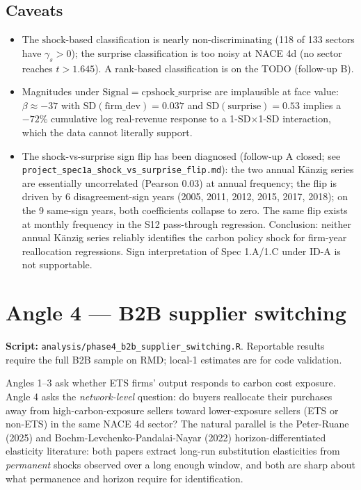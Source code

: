 \documentclass[11pt]{article}
\begin{document}
\subsection{Caveats}
\begin{itemize}
  \item The $\mathrm{shock}$-based classification is nearly non-discriminating (118 of 133 sectors have $\gamma_s > 0$); the $\mathrm{surprise}$ classification is too noisy at NACE 4d (no sector reaches $t > 1.645$). A rank-based classification is on the TODO (follow-up B).
  \item Magnitudes under $\mathrm{Signal}=\mathrm{cpshock\_surprise}$ are implausible at face value: $\beta \approx -37$ with $\mathrm{SD}(\mathrm{firm\_dev}) = 0.037$ and $\mathrm{SD}(\mathrm{surprise}) = 0.53$ implies a $-72\%$ cumulative log real-revenue response to a 1-SD$\times$1-SD interaction, which the data cannot literally support.
  \item The shock-vs-surprise sign flip has been diagnosed (follow-up A closed; see \texttt{project\_spec1a\_shock\_vs\_surprise\_flip.md}): the two annual K\"anzig series are essentially uncorrelated (Pearson 0.03) at annual frequency; the flip is driven by 6 disagreement-sign years (2005, 2011, 2012, 2015, 2017, 2018); on the 9 same-sign years, both coefficients collapse to zero. The same flip exists at monthly frequency in the S12 pass-through regression. Conclusion: neither annual K\"anzig series reliably identifies the carbon policy shock for firm-year reallocation regressions. Sign interpretation of Spec 1.A/1.C under ID-A is not supportable.
\end{itemize}

\section{Angle 4 --- B2B supplier switching}
\label{sec:b2b}

\textbf{Script:} \texttt{analysis/phase4\_b2b\_supplier\_switching.R}. Reportable results require the full B2B sample on RMD; local-1 estimates are for code validation.

Angles 1--3 ask whether ETS firms' output responds to carbon cost exposure. Angle 4 asks the \emph{network-level} question: do buyers reallocate their purchases away from high-carbon-exposure sellers toward lower-exposure sellers (ETS or non-ETS) in the same NACE 4d sector? The natural parallel is the Peter-Ruane (2025) and Boehm-Levchenko-Pandalai-Nayar (2022) horizon-differentiated elasticity literature: both papers extract long-run substitution elasticities from \emph{permanent} shocks observed over a long enough window, and both are sharp about what permanence and horizon require for identification.
\end{document}
